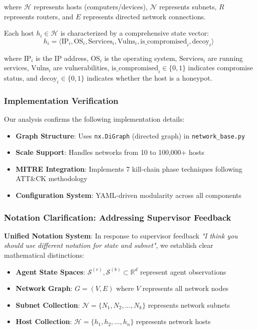 \documentclass[12pt,twoside]{article}
\begin{document}
where $\mathcal{H}$ represents hosts (computers/devices), $\mathcal{N}$ represents subnets, $R$ represents routers, and $E$ represents directed network connections.

Each host $h_i \in \mathcal{H}$ is characterized by a comprehensive state vector:
\begin{equation}
h_i = \langle \text{IP}_i, \text{OS}_i, \text{Services}_i, \text{Vulns}_i, \text{is\_compromised}_i, \text{decoy}_i \rangle
\end{equation}

where $\text{IP}_i$ is the IP address, $\text{OS}_i$ is the operating system, $\text{Services}_i$ are running services, $\text{Vulns}_i$ are vulnerabilities, $\text{is\_compromised}_i \in \{0,1\}$ indicates compromise status, and $\text{decoy}_i \in \{0,1\}$ indicates whether the host is a honeypot.

\subsubsection{Implementation Verification}
Our analysis confirms the following implementation details:
\begin{itemize}
    \item \textbf{Graph Structure}: Uses \texttt{nx.DiGraph} (directed graph) in \texttt{network\_base.py}
    \item \textbf{Scale Support}: Handles networks from 10 to 100,000+ hosts
    \item \textbf{MITRE Integration}: Implements 7 kill-chain phase techniques following ATT\&CK methodology
    \item \textbf{Configuration System}: YAML-driven modularity across all components
\end{itemize}

\subsubsection{Notation Clarification: Addressing Supervisor Feedback}

\textbf{Unified Notation System}: In response to supervisor feedback \textit{"I think you should use different notation for state and subnet"}, we establish clear mathematical distinctions:

\begin{itemize}
\item \textbf{Agent State Spaces}: $\mathcal{S}^{(r)}, \mathcal{S}^{(b)} \subset \mathbb{R}^{d}$ represent agent observations
\item \textbf{Network Graph}: $G = (V, E)$ where $V$ represents all network nodes  
\item \textbf{Subnet Collection}: $\mathcal{N} = \{N_1, N_2, \ldots, N_k\}$ represents network subnets
\item \textbf{Host Collection}: $\mathcal{H} = \{h_1, h_2, \ldots, h_n\}$ represents network hosts
\end{itemize}
\end{document}
